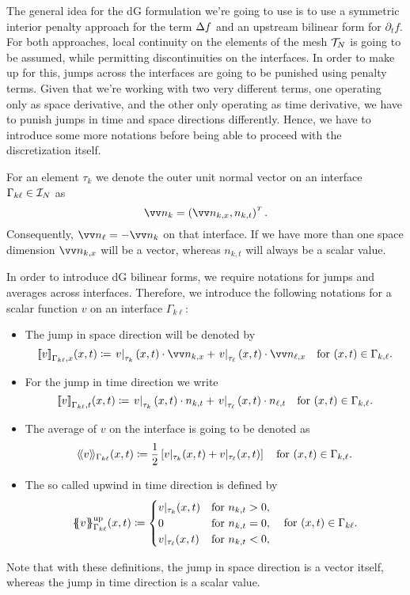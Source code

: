 \documentclass[../thesis.tex]{subfiles}
\begin{document}
The general idea for the dG formulation we're going to use is to use a symmetric interior penalty approach for the term $\Delta f$ and an upstream bilinear form for $\partial_t f$.
For both approaches, local continuity on the elements of the mesh $\mathcal{T}_N$ is going to be assumed, while permitting discontinuities on the interfaces. In order to make up for this, jumps across the interfaces are going to be punished using penalty terms.
Given that we're working with two very different terms, one operating only as space derivative, and the other only operating as time derivative, we have to punish jumps in time and space directions differently.
Hence, we have to introduce some more notations before being able to proceed with the discretization itself.

For an element $\tau_k$ we denote the outer unit normal vector on an interface $\Gamma_{k \ell} \in \mathcal{I}_N$ as
\[
	\markvec{n_k} = \left( \markvec{n_{k, x}}, n_{k, t} \right)^\tp.
\]
Consequently, $\markvec{n_\ell} = - \markvec{n_k}$ on that interface.
If we have more than one space dimension $\markvec{n_{k, x}}$ will be a vector, whereas $n_{k, t}$ will always be a scalar value.

In order to introduce dG bilinear forms, we require notations for jumps and averages across interfaces.
Therefore, we introduce the following notations for a scalar function $v$ on an interface $\Gamma_{k \ell}$:
\begin{itemize}
\item The jump in space direction will be denoted by
\[
	\ljump v \rjump_{\Gamma_{k \ell}, x} (x, t) \coloneqq \left. v \right|_{\tau_k} (x, t) \cdot \markvec{n_{k, x}} + \left. v \right|_{\tau_\ell} (x, t) \cdot \markvec{n_{\ell, x}} \quad \text{for } (x, t) \in \Gamma_{k, \ell}.
\]
\item For the jump in time direction we write
\[
	{\lbrack\!\lbrack} v {\rbrack\!\rbrack}_{\Gamma_{k \ell}, t} (x, t) \coloneqq \left. v \right|_{\tau_k} (x, t) \cdot n_{k, t} + \left. v \right|_{\tau_\ell} (x, t) \cdot  n_{\ell, t} \quad \text{for } (x, t) \in \Gamma_{k, \ell}.
\]
\item The average of $v$ on the interface is going to be denoted as
\[
	\langle\!\langle v \rangle\!\rangle_{\Gamma_{k \ell}} (x, t) \coloneqq \frac{1}{2} \left[ v|_{\tau_k} (x, t) + v|_{\tau_\ell}(x, t) \right] \quad \text{for } (x, t) \in \Gamma_{k, \ell}.
\]
\item The so called upwind in time direction is defined by
\[
	{\{\!\!\{} v {\}\!\!\}}^{\mathrm{up}}_{\Gamma_{k \ell}} (x, t) \coloneqq \begin{cases}
	v|_{\tau_k}(x, t) & \text{for } n_{k, t} > 0, \\
	0 & \text{for } n_{k, t} = 0,\\
	v|_{\tau_\ell}(x, t) & \text{for } n_{k, t} < 0,
	\end{cases} \quad \text{for } (x, t) \in \Gamma_{k \ell}.
\]
\end{itemize}
Note that with these definitions, the jump in space direction is a vector itself, whereas the jump in time direction is a scalar value.
\end{document}

